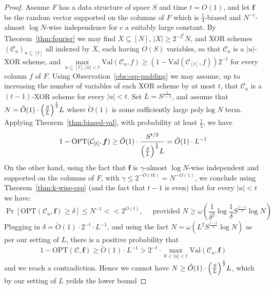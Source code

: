 \documentclass[11pt]{article}
\newcommand{\poly}{\mathrm{poly}}
\newcommand{\Opt}{\mathrm{OPT}}
\newcommand{\N}{[N]}
\begin{document}
\begin{proof}
Assume $F$ has a data structure of space $S$ and time $t=O(1)$, and let $\bm{f}$ be the random vector supported on the columns of $F$ which is $\frac{1}{4}$-biased and $N^{-c}$-almost $\log N$-wise independence for $c$ a suitably large constant. By Theorem~\ref{thm:fourier} we may find $X\subseteq \N$, $|X| \geq 2^{-2^t}N$, and XOR schemes $(\mathcal{C}_u)_{ u \subseteq [t]}$ all indexed by $X$, each having $O(S)$ variables, so that $\mathcal{C}_u$ is a $|u|$-XOR scheme, and 
$   \max\limits_{u \subseteq [t], |u| < t} \mathrm{Val}(\mathcal{C}_u,f) \geq (1- \mathrm{Val}(\mathcal{C}_{[t]},f))2^{-t}$ for every column $f$ of $F$. Using Observation~\ref{obs:csp-padding} we may assume, up to increasing the number of variables of each XOR scheme by at most $t$, that $\mathcal{C}_u$ is a $(t-1)$-XOR scheme for every $|u|<t$. 
Set $L = S^{\frac{1}{t+2}}$, and assume that $N = \tilde{O}(1) \cdot \Bigl(\frac{S}{L}\Bigr)^{\frac{t}{2}}L$ where $\tilde{O}(1)$ is some sufficiently large $\poly\log N$ term. Applying Theorem~\ref{thm:biased-val}, with probability at least $\frac{1}{5}$, we have
\[
1-\Opt(\mathcal{C}_{[t]},\bm{f}) \geq \tilde{O}(1)\cdot  \frac{S^{t/2}}{ \Bigl(\frac{S}{L}\Bigr)^{\frac{t}{2}}L} = \tilde{O}(1) \cdot L^{-1} 
\]
On the other hand, using the fact that $\bm{f}$ is $\gamma$-almost $\log N$-wise independent and supported on the columns of $F$, with $\gamma \leq 2^{-O(tk)} = N^{-O(1)}$, we conclude using Theorem~\ref{thm:k-wise-csp} (and the fact that $t-1$ is even) that for every $|u|<t$ we have:
\[
\Pr[\Opt(\mathcal{C}_u,\bm{f}) \geq \delta] \leq N^{-1} << 2^{O(t)}, \quad \text{ provided }N  \geq \omega( \frac{1}{\delta^2}\log \frac{1}{\delta} S^{\frac{t-1}{2}} \log N)
\]
Plugging in $\delta  = \tilde{O}(1)\cdot  2^{-t} \cdot L^{-1}$, and using the fact $N  = \omega( L^{2} S^{\frac{t-1}{2}} \log N)$ as per our setting of $L$, there is a positive probability that 
\[
1-\Opt(\mathcal{C},\bm{f}) \geq  \tilde{O}(1) \cdot L^{-1} > 2^{-t} \cdot \max_{0 < |u| < t} \mathrm{Val}(\mathcal{C}_u,\bm{f})
\]
and we reach a contradiction. Hence we cannot have $N \geq  \tilde{O}(1) \cdot \Bigl(\frac{S}{L}\Bigr)^{\frac{t}{2}}L$, which by our setting of $L$ yeilds the lower bound

\end{proof}
\end{document}
